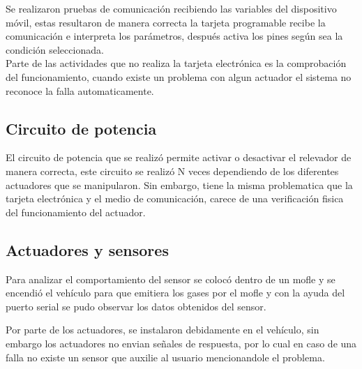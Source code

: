 Se realizaron pruebas de comunicación recibiendo las variables del dispositivo móvil, estas resultaron de manera correcta la tarjeta programable recibe la comunicación e interpreta los parámetros, después activa los pines según sea la condición seleccionada.\\

Parte de las actividades que no realiza la tarjeta electrónica es la comprobación del funcionamiento, cuando existe un problema con algun actuador el sistema no reconoce la falla automaticamente.

\subsection{Circuito de potencia}

El circuito de potencia que se realizó permite activar o desactivar el relevador de manera correcta, este circuito se realizó N veces dependiendo de los diferentes actuadores que se manipularon. Sin embargo, tiene la misma problematica que la tarjeta electrónica y el medio de comunicación, carece de una verificación fisica del funcionamiento del actuador.\\

\subsection{Actuadores y sensores}

Para analizar el comportamiento del sensor se colocó dentro de un mofle y se encendió el vehículo para que emitiera los gases por el mofle y con la ayuda del puerto serial se pudo observar los datos obtenidos del sensor.

Por parte de los actuadores, se instalaron debidamente en el vehículo, sin embargo los actuadores no envian señales de respuesta, por lo cual en caso de una falla no existe un sensor que auxilie al usuario mencionandole el problema.




